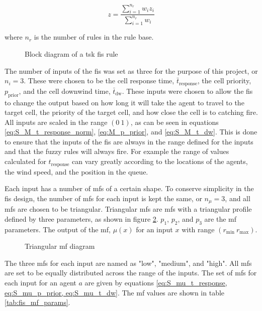 \documentclass[conference]{IEEEtran}
\begin{document}
\begin{equation} \label{eq:tsk_fis_output}
    z = \frac{\sum_{i=1}^{n_{r}} w_{i} z_{i} }{\sum_{i=1}^{n_{r}} w_{i} }
\end{equation}

where $n_{r}$ is the number of rules in the rule base.

\begin{figure}
    \centering
    
    \caption{Block diagram of a \gls{tsk} \gls{fis} rule \cite{mamdani-and-sugeno-fis}}
    \label{fig:tsk_block_diagram}
\end{figure}

The number of inputs of the \gls{fis} was set as three for the purpose of this project, or $n_{i} = 3$.
These were chosen to be the cell response time, $\bar{t}_{\text{response}}$, the cell priority, $p_{\text{prior}}$, and the cell downwind time, $\bar{t}_{\text{dw}}$.
These inputs were chosen to allow the \gls{fis} to change the output based on how long it will take the agent to travel to the target cell, the priority of the target cell, and how close the cell is to catching fire.
All inputs are scaled in the range $(0~1)$, as can be seen in equations \ref{eq:S_M_t_response_norm}, \ref{eq:M_p_prior}, and \ref{eq:S_M_t_dw}.
This is done to ensure that the inputs of the \gls{fis} are always in the range defined for the inputs and that the fuzzy rules will always fire.
For example the range of values calculated for $t_{\text{response}}$ can vary greatly according to the locations of the agents, the wind speed, and the position in the queue.

Each input has a number of \gls{mf}s of a certain shape.
To conserve simplicity in the \gls{fis} design, the number of \gls{mf}s for each input is kept the same, or $n_{\mu} = 3$, and all \gls{mf}s are chosen to be triangular.
Triangular \gls{mf}s are \gls{mf}s with a triangular profile defined by three parameters, as shown in figure \ref{fig:diagram_mf}.
$p_{1}$, $p_{2}$, and $p_{3}$ are the \gls{mf} parameters.
The output of the \gls{mf}, $\mu(x)$ for an input $x$ with range $(r_{\text{min}} ~ r_{\text{max}})$.

\begin{figure}
    \centering
    
    \caption{Triangular \gls{mf} diagram}
    \label{fig:diagram_mf}
\end{figure}

The three \gls{mf}s for each input are named as "low", "medium", and "high".
All \gls{mf}s are set to be equally distributed across the range of the inputs.
The set of \gls{mf}s for each input for an agent $a$ are given by equations \ref{eq:S_mu_t_response, eq:S_mu_p_prior, eq:S_mu_t_dw}.
The \gls{mf} values are shown in table \ref{tab:fis_mf_params}.
\end{document}

